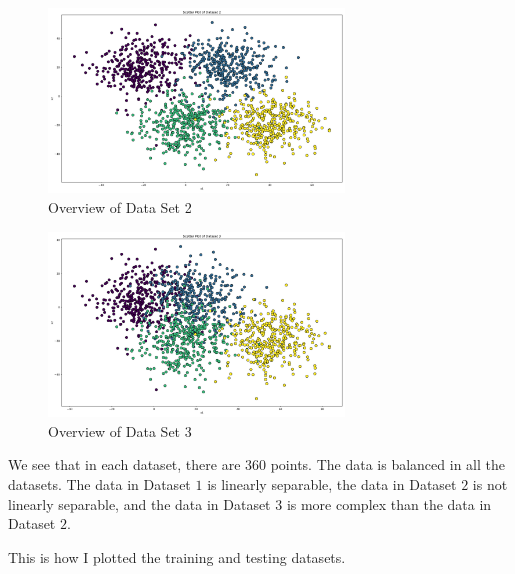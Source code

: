 \begin{figure}[H]
    \centering
    \includegraphics[width=0.7\textwidth]{Images/dataset-2-overview.png}
    \caption{Overview of Data Set 2}
\end{figure}

\begin{figure}[H]
    \centering
    \includegraphics[width=0.7\textwidth]{Images/dataset-3-overview.png}
    \caption{Overview of Data Set 3}
\end{figure}

We see that in each dataset, there are $360$ points. The data is balanced in all the datasets. The data in Dataset $1$ is linearly separable, the data in Dataset $2$ is not linearly separable, and the data in Dataset $3$ is more complex than the data in Dataset $2$.

This is how I plotted the training and testing datasets.

